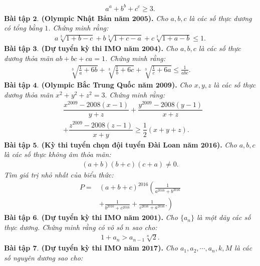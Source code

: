 \begin{multicols}{2}
		\begin{align*}
			a^a + b^b + c^c \ge 3.
		\end{align*}
		\textbf{\color{hoccungpi}Bài tập $\pmb{2.}$ (Olympic Nhật Bản năm $\pmb{2005}$).}
		\textit{Cho $a, b, c$ là các số thực dương có tổng bằng $1$. Chứng minh rằng:}
		\begin{align*}
			a \sqrt[3]{\!1\!+\!b\!-\!c}\!+\!b \sqrt[3]{\!1\!+\!c\!-\!a}\!+\!c \sqrt[3]{\!1\!+\!a\!-\!b} \!\leq\! 1 .
		\end{align*}
		\textbf{\color{hoccungpi}Bài tập $\pmb{3.}$ (Dự tuyển kỳ thi IMO năm $\pmb{2004}$).}
		\textit{Cho $a,b,c$ là các số thực dương thỏa mãn $ab+bc+ca=1$. Chứng minh rằng:}
		\begin{align*}
			\sqrt[3]{\frac{1}{a}+6 b}+\sqrt[3]{\frac{1}{b}+6 c}+\sqrt[3]{\frac{1}{c}+6 a} \leq \frac{1}{a b c}.
		\end{align*}
		\textbf{\color{hoccungpi}Bài tập $\pmb{4.}$ (Olympic Bắc Trung Quốc  năm $\pmb{2009}$).}
		\textit{Cho $x,y,z$ là các số thực dương thỏa mãn $ x^2+y^2+z^2 = 3.$ Chứng minh rằng:}
		\begin{align*}
				&\dfrac{{{x^{2009}} - 2008(x - 1)}}{{y + z}} + \dfrac{{{y^{2009}} - 2008(y - 1)}}{{x + z}} \\
				&+ \dfrac{{{z^{2009}} - 2008(z - 1)}}{{x + y}} \ge \dfrac{1}{2}(x + y + z).
		\end{align*}
		\textbf{\color{hoccungpi}Bài tập $\pmb{5.}$ (Kỳ thi tuyển chọn đội tuyển Đài Loan năm $\pmb{2016}$).}
		\vskip 0.1cm
		\textit{Cho $a,b,c$ là các số thực không âm thỏa mãn:
		\begin{align*}
			(a+b)(b+c)(c+a) \neq 0.
		\end{align*}
		Tìm giá trị nhỏ nhất của biểu thức:}
		\begin{align*}
			P=&{(a + b + c)^{2016}}\left(\frac{1}{{{a^{2016}} + {b^{2016}}}}\right.\\
			 &\left.+ \frac{1}{{{b^{2016}} + {c^{2016}}}} + \frac{1}{{{c^{2016}} + {a^{2016}}}}.\right)
		\end{align*}
		\textbf{\color{hoccungpi}Bài tập $\pmb{6.}$ (Dự tuyển kỳ thi IMO năm $\pmb{2001}$).} \textit{Cho $\{a_n\}$ là một dãy các số thực dương. Chứng minh rằng có vô số $n$ sao cho:}
		\begin{align*}
			1 + a_n > a_{n-1} \sqrt[n]{2}.
		\end{align*}
		\textbf{\color{hoccungpi}Bài tập $\pmb{7.}$ (Dự tuyển kỳ thi IMO năm $\pmb{2017}$).}
		\textit{Cho $a_1,a_2,\cdots,a_n,k,M$ là các số nguyên dương sao cho: 
		\begin{align*}

\end{align*}}
\end{multicols}
